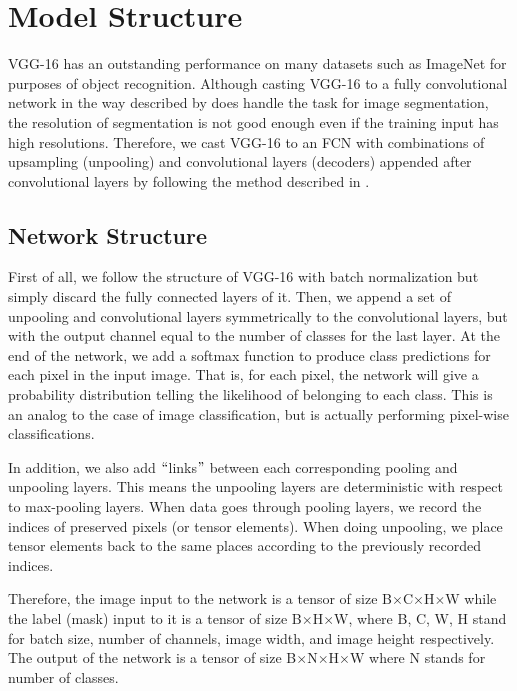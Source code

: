 \documentclass[10pt,twocolumn,letterpaper]{article}
\begin{document}
\section{Model Structure}
VGG-16 has an outstanding performance on many datasets such as ImageNet for purposes of object recognition. Although casting VGG-16 \cite{Simonyan14c} to a fully convolutional network in the way described by \cite{Long_2015_CVPR} does handle the task for image segmentation, the resolution of segmentation is not good enough even if the training input has high resolutions. Therefore, we cast VGG-16 to an FCN with combinations of upsampling (unpooling) and convolutional layers (decoders) appended after convolutional layers by following the method described in \cite{badrinarayanan2015segnet2}.

\subsection{Network Structure}
First of all, we follow the structure of VGG-16 with batch normalization but simply discard the fully connected layers of it. Then, we append a set of unpooling and convolutional layers symmetrically to the convolutional layers, but with the output channel equal to the number of classes for the last layer. At the end of the network, we add a softmax function to produce class predictions for each pixel in the input image. That is, for each pixel, the network will give a probability distribution telling the likelihood of belonging to each class. This is an analog to the case of image classification, but is actually performing pixel-wise classifications.

In addition, we also add $``$links$"$ between each corresponding pooling and unpooling layers. This means the unpooling layers are deterministic with respect to max-pooling layers. When data goes through pooling layers, we record the indices of preserved pixels (or tensor elements). When doing unpooling, we place tensor elements back to the same places according to the previously recorded indices.

Therefore, the image input to the network is a tensor of size B$\times$C$\times$H$\times$W while the label (mask) input to it is a tensor of size B$\times$H$\times$W, where B, C, W, H stand for batch size, number of channels, image width, and image height respectively. The output of the network is a tensor of size B$\times$N$\times$H$\times$W where N stands for number of classes.
\end{document}
